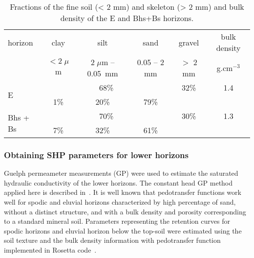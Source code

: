 \documentclass[review]{elsarticle}
\begin{document}
 \begin{table}[ht]
 	\begin{center}
 		\caption{Fractions of the fine soil (< 2 mm) and skeleton (> 2 mm) and bulk density of the E and Bhs+Bs horizons.}
 		\begin{small}
 			\doublespacing
 			\begin{tabular}{l c  c  c  c  c}
 				\toprule
 				horizon & clay & silt & sand  & gravel & bulk density  \\ 
 				&  $<2\;\mu$m & $2\;\mu$m -- 0.05~mm & 0.05 -- 2 mm & $>$ 2 mm & g.cm$^{-3}$ \\ \hline
 				\multirow{2}{*}{E}      & \multicolumn{3}{c}{68\%}               & \multirow{1}{*}{32\%}  &\multirow{1}{*}{1.4}   \\ 
 				\cmidrule{2-4}
 				&  1\%               & 20\%                        & 79\%      & &\\
 				
 				\multirow{2}{*}{Bhs + Bs }      & \multicolumn{3}{c}{70\%}               & \multirow{1}{*}{30\%}  &\multirow{1}{*}{1.3}   \\ 
 				\cmidrule{2-4}
 				&7\%           & 32\%                       & 61\%          & &\\
 				
 				\toprule
 			\end{tabular}
 		\end{small}
 		\label{tab:soiltxt}
 	\end{center}
 \end{table}







\subsubsection{Obtaining SHP parameters for lower horizons}
\label{dolni}

Guelph permeameter measurements (GP) were used to estimate the saturated hydraulic conductivity of the lower horizons. The constant head GP method applied here is described in~\citep{Jacka1}.
It is well known that pedotransfer functions work well for spodic and eluvial horizons characterized by high percentage of sand, without a distinct structure, and with a bulk density and porosity corresponding to a standard mineral soil. Parameters representing the retention curves for spodic horizons and eluvial horizon below the top-soil were estimated using the soil texture and the bulk density information with pedotransfer function implemented in Rosetta code~\citep{Schaap}.
\end{document}
